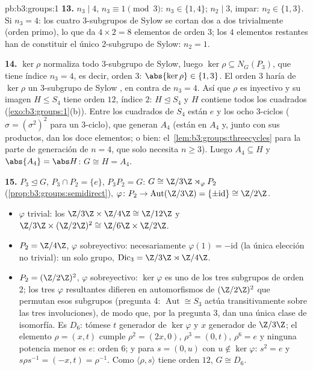 \begin{solution}{pb:b3:groups:1}
\textbf{13.} $n_3 \mid 4$, $n_3 \equiv 1 \pmod 3$: $n_3 \in \{1,
4\}$; $n_2 \mid 3$, impar: $n_2 \in \{1, 3\}$. Si $n_3 = 4$: los cuatro
$3$-subgrupos de Sylow se cortan dos a dos trivialmente (orden primo),
lo que da $4 \times 2 = 8$ elementos de orden $3$; los $4$ elementos
restantes han de constituir el único $2$-subgrupo de Sylow: $n_2 = 1$.

\textbf{14.} $\ker\rho$ normaliza todo $3$-subgrupo de Sylow, luego
$\ker \rho \subseteq N_G(P_3)$, que tiene índice $n_3 = 4$, es decir,
orden $3$: $\abs{\ker\rho} \in \{1, 3\}$. El orden $3$ haría de
$\ker\rho$ un $3$-subgrupo de Sylow
\emph{}, en contra de $n_3
= 4$. Así que $\rho$ es inyectivo y su imagen $H \leq S_4$ tiene orden
$12$, índice $2$: $H \trianglelefteq S_4$ y $H$ contiene todos los
cuadrados (\cref{exo:b3:groups:1}(b)). Entre los cuadrados de $S_4$
están $e$ y los ocho $3$-ciclos ($\sigma = (\sigma^2)^2$ para un
$3$-ciclo), que generan $A_4$ (están en $A_4$ y, junto con sus
productos, dan los doce elementos; o bien:
el~\cref{lem:b3:groups:threecycles} para la parte de generación de
$n = 4$, que solo necesita $n \geq 3$). Luego $A_4 \subseteq H$ y
$\abs{A_4}
= \abs H$: $G \cong H = A_4$.

\textbf{15.} $P_3 \trianglelefteq G$, $P_3 \cap P_2 = \{e\}$,
$P_3P_2 = G$: $G \cong \Z/3\Z \rtimes_\varphi P_2$
(\cref{prop:b3:groups:semidirect}), $\varphi \colon P_2 \to
\operatorname{Aut}(\Z/3\Z) = \{\pm\mathrm{id}\} \cong \Z/2\Z$.
\begin{itemize}
  \item $\varphi$ trivial: los  $\Z/3\Z \times \Z/4\Z
        \cong \Z/12\Z$ y $\Z/3\Z \times (\Z/2\Z)^2 \cong \Z/6\Z
        \times \Z/2\Z$. \item $P_2 = \Z/4\Z$, $\varphi$ sobreyectivo:
  necesariamente $\varphi(1) = -\mathrm{id}$ (la única elección no
  trivial): un solo grupo, $\mathrm{Dic}_3 = \Z/3\Z \rtimes \Z/4\Z$.
  \item $P_2 = (\Z/2\Z)^2$, $\varphi$ sobreyectivo: $\ker\varphi$ es uno
  de los tres subgrupos de orden $2$; los tres $\varphi$ resultantes
  difieren en automorfismos de $(\Z/2\Z)^2$ que permutan esos subgrupos
  (pregunta 4: $\operatorname{Aut}
        \cong S_3$ actúa transitivamente sobre las tres involuciones),
  de modo que, por la pregunta 3, dan una única clase de isomorfía. Es
  $D_6$: tómese $t$ generador de $\ker\varphi$ y $x$ generador de
  $\Z/3\Z$; el elemento $\rho = (x, t)$ cumple $\rho^2 = (2x, 0)$,
  $\rho^3 = (0, t)$, $\rho^6 = e$ y ninguna potencia menor es $e$: orden
  $6$; y para $s = (0, u)$ con $u
        \notin \ker\varphi$: $s^2 = e$ y $s\rho s^{-1} = (-x, t)
        = \rho^{-1}$. Como $\langle \rho, s\rangle$ tiene orden $12$,
        $G \cong D_6$.
\end{itemize}


\end{solution}
